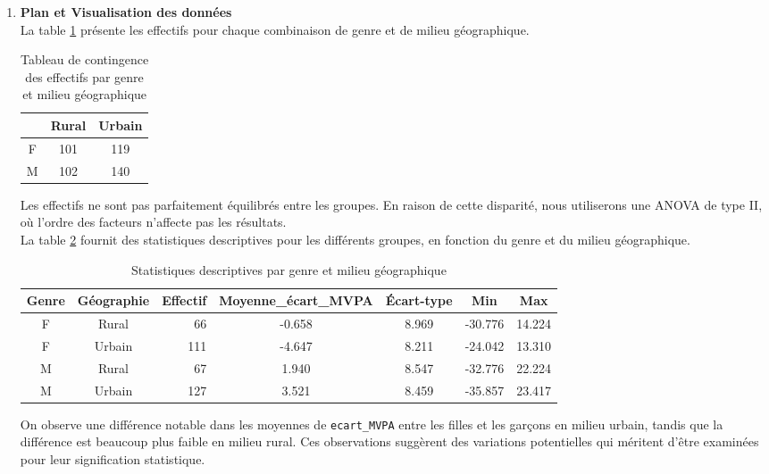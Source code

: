 \documentclass[12pt,a4paper]{article}
\begin{document}
\begin{enumerate}[label=\textbf{\alph*})]
\item \textbf{Plan et Visualisation des données}  \\

\noindent
La table \ref{tab:tab_contingence_3} présente les effectifs pour chaque combinaison de genre et de milieu géographique. 

\begin{table}[H]
	\centering
	\caption{Tableau de contingence des effectifs par genre et milieu géographique}
	\begin{tabular}{ccc}
		\toprule
		& Rural & Urbain \\
		\midrule
		F & 101 & 119 \\
		M & 102 & 140 \\
		\bottomrule
	\end{tabular}
	\label{tab:tab_contingence_3}
\end{table}

\noindent
Les effectifs ne sont pas parfaitement équilibrés entre les groupes. En raison de cette disparité, nous utiliserons une ANOVA de type II, où l'ordre des facteurs n'affecte pas les résultats. \\

\noindent
La table \ref{tab:desc_stats_4} fournit des statistiques descriptives pour les différents groupes, en fonction du genre et du milieu géographique.

\begin{table}[H]
	\centering
	\caption{Statistiques descriptives par genre et milieu géographique}
	\begin{tabular}{ccrcccc}
		\toprule
		\textbf{Genre} & \textbf{Géographie} & \textbf{Effectif} & \textbf{Moyenne\_écart\_MVPA} & \textbf{Écart-type} & \textbf{Min} & \textbf{Max} \\
		\midrule
		F & Rural & 66 & -0.658 & 8.969 & -30.776 & 14.224 \\
		F & Urbain & 111 & -4.647 & 8.211 & -24.042 & 13.310 \\
		M & Rural & 67 & 1.940 & 8.547 & -32.776 & 22.224 \\
		M & Urbain & 127 & 3.521 & 8.459 & -35.857 & 23.417 \\
		\bottomrule
	\end{tabular}
	\label{tab:desc_stats_4}
\end{table}

\noindent
On observe une différence notable dans les moyennes de \texttt{ecart\_MVPA} entre les filles et les garçons en milieu urbain, tandis que la différence est beaucoup plus faible en milieu rural. Ces observations suggèrent des variations potentielles qui méritent d'être examinées pour leur signification statistique. \\



\end{enumerate}
\end{document}

